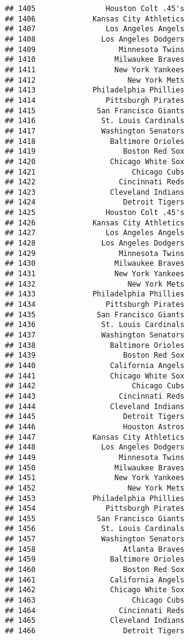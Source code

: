 \documentclass[]{article}
\begin{document}
\begin{verbatim}
## 1405                Houston Colt .45's
## 1406             Kansas City Athletics
## 1407                Los Angeles Angels
## 1408               Los Angeles Dodgers
## 1409                   Minnesota Twins
## 1410                  Milwaukee Braves
## 1411                  New York Yankees
## 1412                     New York Mets
## 1413             Philadelphia Phillies
## 1414                Pittsburgh Pirates
## 1415              San Francisco Giants
## 1416               St. Louis Cardinals
## 1417               Washington Senators
## 1418                 Baltimore Orioles
## 1419                    Boston Red Sox
## 1420                 Chicago White Sox
## 1421                      Chicago Cubs
## 1422                   Cincinnati Reds
## 1423                 Cleveland Indians
## 1424                    Detroit Tigers
## 1425                Houston Colt .45's
## 1426             Kansas City Athletics
## 1427                Los Angeles Angels
## 1428               Los Angeles Dodgers
## 1429                   Minnesota Twins
## 1430                  Milwaukee Braves
## 1431                  New York Yankees
## 1432                     New York Mets
## 1433             Philadelphia Phillies
## 1434                Pittsburgh Pirates
## 1435              San Francisco Giants
## 1436               St. Louis Cardinals
## 1437               Washington Senators
## 1438                 Baltimore Orioles
## 1439                    Boston Red Sox
## 1440                 California Angels
## 1441                 Chicago White Sox
## 1442                      Chicago Cubs
## 1443                   Cincinnati Reds
## 1444                 Cleveland Indians
## 1445                    Detroit Tigers
## 1446                    Houston Astros
## 1447             Kansas City Athletics
## 1448               Los Angeles Dodgers
## 1449                   Minnesota Twins
## 1450                  Milwaukee Braves
## 1451                  New York Yankees
## 1452                     New York Mets
## 1453             Philadelphia Phillies
## 1454                Pittsburgh Pirates
## 1455              San Francisco Giants
## 1456               St. Louis Cardinals
## 1457               Washington Senators
## 1458                    Atlanta Braves
## 1459                 Baltimore Orioles
## 1460                    Boston Red Sox
## 1461                 California Angels
## 1462                 Chicago White Sox
## 1463                      Chicago Cubs
## 1464                   Cincinnati Reds
## 1465                 Cleveland Indians
## 1466                    Detroit Tigers

\end{verbatim}
\end{document}
